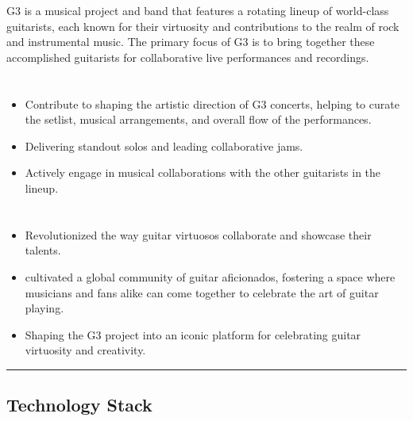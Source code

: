 \documentclass[12pt]{../templates/classes/res}
\begin{document}
\begin{resume}
\begin{multicols}{2}
  \columnbreak
  {\footnotesize{G3 is a musical project and band that features a rotating lineup of world-class guitarists, each known for their virtuosity and contributions to the realm of rock and instrumental music. The primary focus of G3 is to bring together these accomplished guitarists for collaborative live performances and recordings.}}\\
\end{multicols}
\vspace{-20pt}

\begin{multicols}{2}
  \section{}
    \begin{itemize}
      \item Contribute to shaping the artistic direction of G3 concerts, helping to curate the setlist, musical arrangements, and overall flow of the performances. 
\item Delivering standout solos and leading collaborative jams.
\item Actively engage in musical collaborations with the other guitarists in the lineup.
    \end{itemize}
  \section{}
    \begin{itemize}
      \setlength{\itemindent}{0pt}
      \item Revolutionized the way guitar virtuosos collaborate and showcase their talents.
\item cultivated a global community of guitar aficionados, fostering a space where musicians and fans alike can come together to celebrate the art of guitar playing.
\item Shaping the G3 project into an iconic platform for celebrating guitar virtuosity and creativity.
    \end{itemize}
\end{multicols}

\vspace{-20pt}
\begin{minipage}[t]{0.55\linewidth}
  \rule{0.25\textwidth}{2pt}
  \begin{multicols}{2}
    \section{Technology Stack}
    \columnbreak

\end{multicols}
\end{minipage}
\end{resume}
\end{document}
